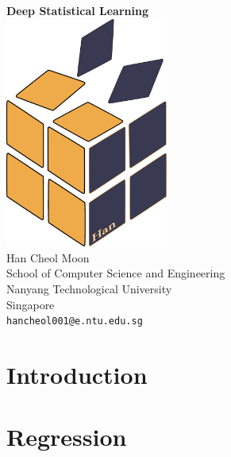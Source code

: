 \documentclass[oneside, a4paper,11pt]{book}
\begin{document}
\begin{titlepage}
	\begin{center}
		\vspace*{5.5cm}
		\textbf{\Huge Deep Statistical Learning}\\
        \vspace{2.5cm}
		\includegraphics[width=0.4\textwidth]{./logo/new_logo.pdf}\\
        \vspace{1.5cm}
        \vspace{1.5cm}
		Han Cheol Moon\\
		School of Computer Science and Engineering\\
		Nanyang Technological University\\
		Singapore\\
		\texttt{hancheol001@e.ntu.edu.sg}
		\date{\today}
	\end{center}
\end{titlepage}

\tableofcontents
\newpage

\mainmatter
\part{Introduction}
% 






\part{Regression}

\end{document}

